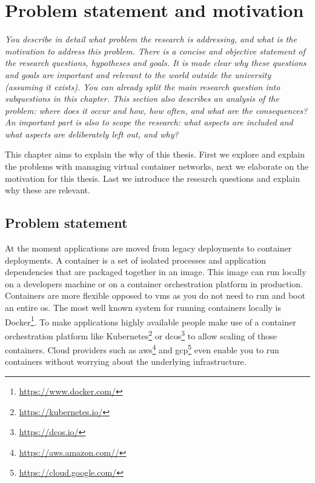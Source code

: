 \chapter{Problem statement and motivation}
\emph{You describe in detail what problem the research is addressing,
and what is the motivation to address this problem. There is a concise and objective
statement of the research questions, hypotheses and goals. It is made clear why these questions
and goals are important and relevant to the world outside the university (assuming it exists).
You can already split the main research question into subquestions in this chapter. This section
also describes an analysis of the problem: where does it occur and how, how often, and what are
the consequences? An important part is also to scope the research: what aspects are included
and what aspects are deliberately left out, and why?}

This chapter aims to explain the why of this thesis. First we explore and explain the problems with managing virtual container networks, next we elaborate on the motivation for this thesis. Last we introduce the research questions and explain why these are relevant.

\section{Problem statement}
At the moment applications are moved from legacy deployments to container deployments. A container is a set of isolated processes and application dependencies that are packaged together in an image. This image can run locally on a developers machine or on a container orchestration platform in production. Containers are more flexible opposed to \glspl{vm} as you do not need to run and boot an entire \gls{os}. The most well known system for running containers locally is Docker\footnote{\url{https://www.docker.com/}}. To make applications highly available people make use of a container orchestration platform like Kubernetes\footnote{\url{https://kubernetes.io/}} or \gls{dcos}\footnote{\url{https://dcos.io/}} to allow scaling of those containers. Cloud providers such as \gls{aws}\footnote{\url{https://aws.amazon.com//}} and \gls{gcp}\footnote{\url{https://cloud.google.com/}} even enable you to run containers without worrying about the underlying infrastructure. 


